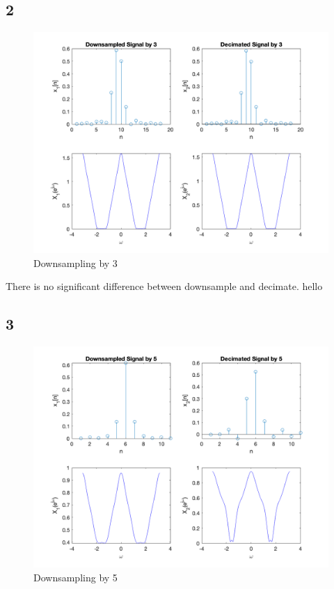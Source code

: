 \documentclass{article}
\begin{document}
\subsection*{2}

\begin{figure}[H]
    \centering
    \includegraphics[scale = 0.4]{Downsample 3.png}
    \caption{Downsampling by 3}
    \label{Downsampling by 3}
\end{figure}

There is no significant difference between downsample and decimate. hello


\subsection*{3}

\begin{figure}[H]
    \centering
    \includegraphics[scale = 0.4]{Downsample 5.png}
    \caption{Downsampling by 5}
    \label{Downsampling by 5}
\end{figure}
\end{document}
